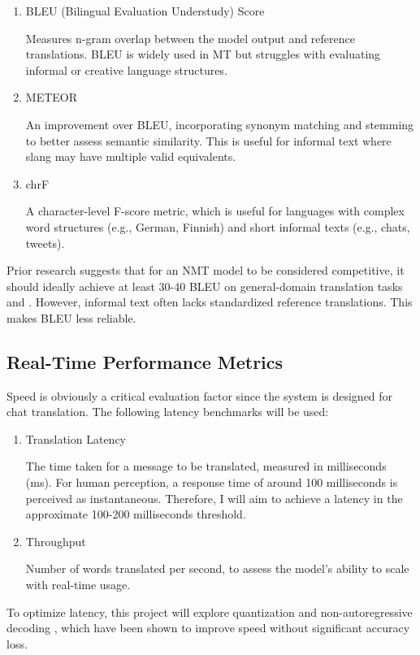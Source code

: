 \documentclass[10pt,twocolumn]{article}
\begin{document}
\begin{enumerate}
    \item BLEU (Bilingual Evaluation Understudy) Score \cite{PapineniBLEU2002}
    
Measures n-gram overlap between the model output and reference translations. BLEU is widely used in MT but struggles with evaluating informal or creative language structures.

    \item METEOR \cite{BanerjeeMETEOR2005}
    
An improvement over BLEU, incorporating synonym matching and stemming to better assess semantic similarity. This is useful for informal text where slang may have multiple valid equivalents.

    \item chrF \cite{PopovicCHRF2015}
    
A character-level F-score metric, which is useful for languages with complex word structures (e.g., German, Finnish) and short informal texts (e.g., chats, tweets).

\end{enumerate}
Prior research suggests that for an NMT model to be considered competitive, it should ideally achieve at least 30-40 BLEU on general-domain translation tasks \cite{WuGoogleTranslate2016} and \cite{VaswaniTransformers2017}. However, informal text often lacks standardized reference translations. This makes BLEU less reliable.

\subsection{Real-Time Performance Metrics}

Speed is obviously a critical evaluation factor since the system is designed for chat translation. The following latency benchmarks will be used:

\begin{enumerate}
    \item Translation Latency

The time taken for a message to be translated, measured in milliseconds (ms). For human perception, a response time of around 100 milliseconds is perceived as instantaneous. Therefore, I will aim to achieve a latency in the approximate 100-200 milliseconds threshold.

    \item Throughput

Number of words translated per second, to assess the model’s ability to scale with real-time usage. 


\end{enumerate}
To optimize latency, this project will explore quantization \cite{ZafrirQ8BERT2019} and non-autoregressive decoding \cite{KasaiDeepEncoders2021}, which have been shown to improve speed without significant accuracy loss.
\end{document}
